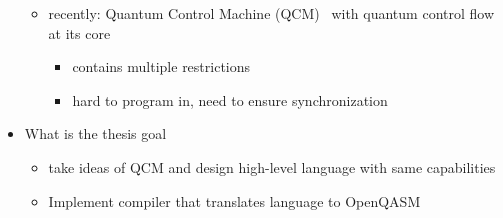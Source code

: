 \begin{itemize}
\begin{itemize}
        \item recently: Quantum Control Machine (QCM)~\cite{YVC24} with quantum control flow at its core 
        \begin{itemize}
            \item contains multiple restrictions
            \item hard to program in, \eg need to ensure synchronization
        \end{itemize}
    \end{itemize}
    \item What is the thesis goal
    \begin{itemize}
        \item take ideas of QCM and design high-level language with same capabilities
        \item Implement compiler that translates language to OpenQASM
    \end{itemize}
\end{itemize}
